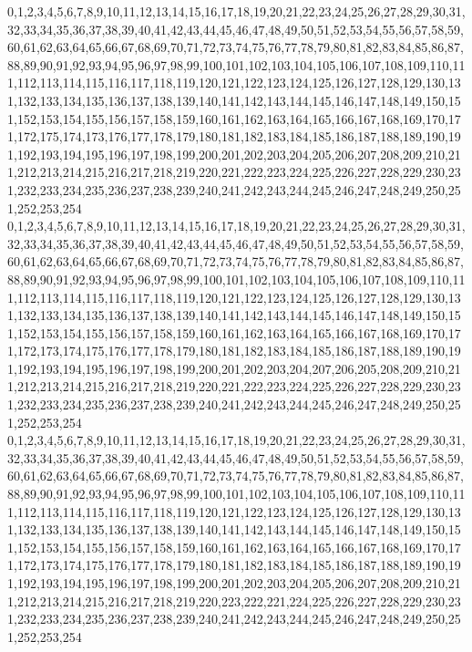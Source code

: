 \documentclass[12pt]{article}
\begin{document}
{0,1,2,3,4,5,6,7,8,9,10,11,12,13,14,15,16,17,18,19,20,21,22,23,24,25,26,27,28,29,30,31,32,33,34,35,36,37,38,39,40,41,42,43,44,45,46,47,48,49,50,51,52,53,54,55,56,57,58,59,60,61,62,63,64,65,66,67,68,69,70,71,72,73,74,75,76,77,78,79,80,81,82,83,84,85,86,87,88,89,90,91,92,93,94,95,96,97,98,99,100,101,102,103,104,105,106,107,108,109,110,111,112,113,114,115,116,117,118,119,120,121,122,123,124,125,126,127,128,129,130,131,132,133,134,135,136,137,138,139,140,141,142,143,144,145,146,147,148,149,150,151,152,153,154,155,156,157,158,159,160,161,162,163,164,165,166,167,168,169,170,171,172,175,174,173,176,177,178,179,180,181,182,183,184,185,186,187,188,189,190,191,192,193,194,195,196,197,198,199,200,201,202,203,204,205,206,207,208,209,210,211,212,213,214,215,216,217,218,219,220,221,222,223,224,225,226,227,228,229,230,231,232,233,234,235,236,237,238,239,240,241,242,243,244,245,246,247,248,249,250,251,252,253,254\\
0,1,2,3,4,5,6,7,8,9,10,11,12,13,14,15,16,17,18,19,20,21,22,23,24,25,26,27,28,29,30,31,32,33,34,35,36,37,38,39,40,41,42,43,44,45,46,47,48,49,50,51,52,53,54,55,56,57,58,59,60,61,62,63,64,65,66,67,68,69,70,71,72,73,74,75,76,77,78,79,80,81,82,83,84,85,86,87,88,89,90,91,92,93,94,95,96,97,98,99,100,101,102,103,104,105,106,107,108,109,110,111,112,113,114,115,116,117,118,119,120,121,122,123,124,125,126,127,128,129,130,131,132,133,134,135,136,137,138,139,140,141,142,143,144,145,146,147,148,149,150,151,152,153,154,155,156,157,158,159,160,161,162,163,164,165,166,167,168,169,170,171,172,173,174,175,176,177,178,179,180,181,182,183,184,185,186,187,188,189,190,191,192,193,194,195,196,197,198,199,200,201,202,203,204,207,206,205,208,209,210,211,212,213,214,215,216,217,218,219,220,221,222,223,224,225,226,227,228,229,230,231,232,233,234,235,236,237,238,239,240,241,242,243,244,245,246,247,248,249,250,251,252,253,254\\
0,1,2,3,4,5,6,7,8,9,10,11,12,13,14,15,16,17,18,19,20,21,22,23,24,25,26,27,28,29,30,31,32,33,34,35,36,37,38,39,40,41,42,43,44,45,46,47,48,49,50,51,52,53,54,55,56,57,58,59,60,61,62,63,64,65,66,67,68,69,70,71,72,73,74,75,76,77,78,79,80,81,82,83,84,85,86,87,88,89,90,91,92,93,94,95,96,97,98,99,100,101,102,103,104,105,106,107,108,109,110,111,112,113,114,115,116,117,118,119,120,121,122,123,124,125,126,127,128,129,130,131,132,133,134,135,136,137,138,139,140,141,142,143,144,145,146,147,148,149,150,151,152,153,154,155,156,157,158,159,160,161,162,163,164,165,166,167,168,169,170,171,172,173,174,175,176,177,178,179,180,181,182,183,184,185,186,187,188,189,190,191,192,193,194,195,196,197,198,199,200,201,202,203,204,205,206,207,208,209,210,211,212,213,214,215,216,217,218,219,220,223,222,221,224,225,226,227,228,229,230,231,232,233,234,235,236,237,238,239,240,241,242,243,244,245,246,247,248,249,250,251,252,253,254\\
}
\end{document}
